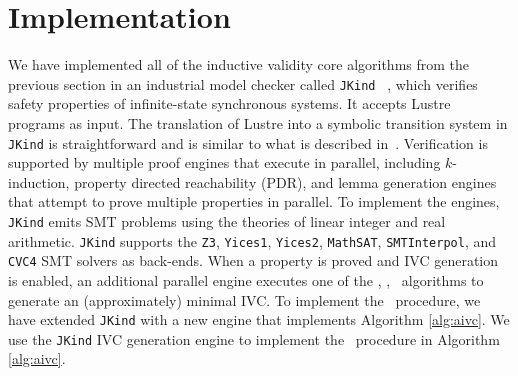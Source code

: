 \chapter{Implementation}
\label{sec:impl}

We have implemented all of the inductive validity core algorithms from the previous section in an industrial model checker called \texttt{JKind} ~\cite{jkind},
which verifies safety properties of infinite-state synchronous systems.
It accepts Lustre programs \cite{Halbwachs91:lustre} as input.  The translation of Lustre
into a symbolic transition system in \texttt{JKind} is straightforward and is similar to what is described
in~\cite{Hagen08:FMCAD}.
Verification is supported by multiple proof engines that execute in parallel, including $k$-induction,
property directed reachability (PDR), and lemma generation engines that attempt to prove
multiple properties in parallel.  To implement the engines,
\texttt{JKind} emits SMT problems using the theories of linear integer and real arithmetic.  \texttt{JKind} supports the
\texttt{Z3}, \texttt{Yices1}, \texttt{Yices2}, \texttt{MathSAT}, \texttt{SMTInterpol}, and \texttt{CVC4} SMT solvers as back-ends.  When a property is
proved and IVC generation is enabled, an additional parallel engine
executes one of the {\ucalg, \bfalg, \ucbfalg}~algorithms \cite{Ghass16} to generate an (approximately) minimal IVC.
%
To implement the \aivcalg\ procedure, we have extended \texttt{JKind} with a new engine that implements Algorithm \ref{alg:aivc}.
We use the \texttt{JKind} IVC generation engine to implement the \getivc\ procedure in  Algorithm \ref{alg:aivc}.

